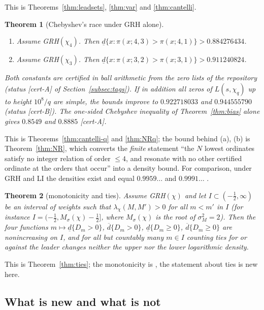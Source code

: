 \documentclass[11pt]{amsart}
\newtheorem{theorem}{Theorem}[section]
\theoremstyle{definition}
\numberwithin{equation}{section}
\newcommand{\dlow}{\underline{d}}
\newcommand{\dup}{\overline{d}}
\newcommand{\certA}{\textsf{[cert-A]}}
\newcommand{\certB}{\textsf{[cert-B]}}
\begin{document}
This is Theorems~\ref{thm:leadsets}, \ref{thm:var} and
\ref{thm:cantelli}.

\begin{theorem}[Chebyshev's race under GRH alone]\label{thm:cheb}
\begin{enumerate}
\item[(a)] Assume GRH$(\chi_4)$. Then
$\dlow\{x:\pi(x;4,3)>\pi(x;4,1)\}>0.884276434$.
\item[(b)] Assume GRH$(\chi_3)$. Then
$\dlow\{x:\pi(x;3,2)>\pi(x;3,1)\}>0.911240824$.
\end{enumerate}
Both constants are certified in ball arithmetic from the zero lists
of the repository (status \certA{} of Section~\ref{subsec:tags}). If
in addition all zeros of $L(s,\chi_q)$ up to height $10^8/q$ are
simple, the bounds improve to $0.922718033$ and $0.944555790$
(status \certB). The one-sided Chebyshev inequality of
Theorem~\ref{thm:bias} alone gives $0.8549$ and $0.8885$ \certA.
\end{theorem}

This is Theorems~\ref{thm:cantelli-q} and \ref{thm:NRq}; the bound
behind (a), (b) is Theorem~\ref{thm:NR}, which converts the
\emph{finite} statement ``the $N$ lowest ordinates satisfy no integer
relation of order $\le4$, and resonate with no other certified
ordinate at the orders that occur'' into a density bound. For
comparison, under GRH and LI the densities exist and equal
$0.9959\ldots$ and $0.9991\ldots$ \cite{RS94}.

\begin{theorem}[monotonicity and ties]\label{thm:tiesintro}
Assume GRH$(\chi)$ and let $I\subset(-\tfrac12,\infty)$ be an
interval of weights such that $\lambda_\chi(M,M')>0$ for all $m<m'$
in $I$ (for instance $I=(-\tfrac12,M_\sigma(\chi)-\tfrac12]$, where
$M_\sigma(\chi)$ is the root of $\sigma_M^2=2$). Then the four
functions $m\mapsto\dlow\{D_m>0\}$, $\dup\{D_m>0\}$,
$\dlow\{D_m\ge0\}$, $\dup\{D_m\ge0\}$ are nonincreasing on $I$, and
for all but countably many $m\in I$ counting ties for or against the
leader changes neither the upper nor the lower logarithmic density.
\end{theorem}

This is Theorem~\ref{thm:ties}; the monotonicity is
\cite[the corollary on densities without LI]{MC}, the statement about ties is new here.

\subsection{What is new and what is not}\label{subsec:new}
\end{document}
